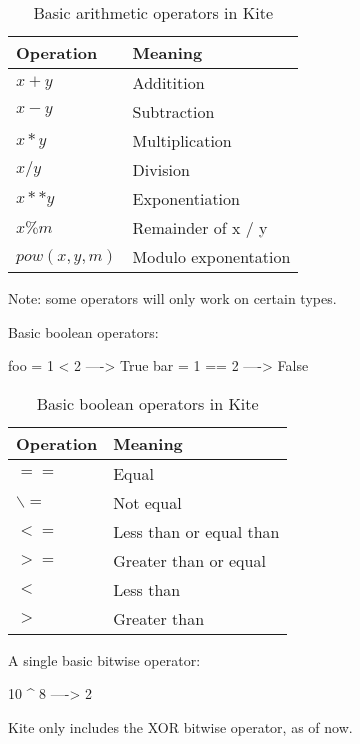 \begin{table}[H]
  \centering
  \begin{tabular}{|l|l|}
    \hline
    Operation      & Meaning              \\ \hline
    $x + y$        & Additition           \\ \hline
    $x - y$        & Subtraction          \\ \hline
    $x * y$        & Multiplication       \\ \hline
    $x / y$        & Division             \\ \hline
    $x**y$         & Exponentiation       \\ \hline
    $x \% m$       & Remainder of x / y   \\ \hline
    $pow(x, y, m)$ & Modulo exponentation \\ \hline
  \end{tabular}
  \label{tbl:kite-design-arith-op}
  \caption{Basic arithmetic operators in Kite}
\end{table}
Note: some operators will only work on certain types.

Basic boolean operators:
\begin{kite}
foo = 1 < 2  ----> True
bar = 1 == 2 ----> False
\end{kite}

\begin{table}[H]
  \centering
  \begin{tabular}{|l|l|}
    \hline
    Operation     & Meaning                 \\ \hline
    $==$          & Equal                   \\ \hline
    $\backslash=$ & Not equal               \\ \hline
    $<=$          & Less than or equal than \\ \hline
    $>=$          & Greater than or equal   \\ \hline
    $<$           & Less than               \\ \hline
    $>$           & Greater than            \\ \hline
  \end{tabular}
  \label{tbl:kite-disign-bool-op}
  \caption{Basic boolean operators in Kite}
\end{table}

A single basic bitwise operator:
\begin{kite}
10 ^ 8 ----> 2
\end{kite}
Kite only includes the XOR bitwise operator, as of now.


